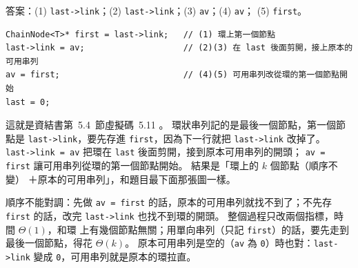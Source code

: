 \begin{pastsoln}
答案：(1) \texttt{last->link}；(2) \texttt{last->link}；(3) \texttt{av}；(4) \texttt{av}；
(5) \texttt{first}。

\begin{verbatim}
ChainNode<T>* first = last->link;   // (1) 環上第一個節點
last->link = av;                    // (2)(3) 在 last 後面剪開，接上原本的可用串列
av = first;                         // (4)(5) 可用串列改從環的第一個節點開始
last = 0;
\end{verbatim}

這就是資結書第~5.4~節虛擬碼~5.11 。 環狀串列記的是最後一個節點，第一個節點是
\texttt{last->link}，要先存進 \texttt{first}，因為下一行就把 \texttt{last->link} 改掉了。
\texttt{last->link = av} 把環在 \texttt{last} 後面剪開，接到原本可用串列的開頭；
\texttt{av = first} 讓可用串列從環的第一個節點開始。 結果是「環上的 $k$ 個節點（順序不變）
＋原本的可用串列」，和題目最下面那張圖一樣。

順序不能對調：先做 \texttt{av = first} 的話，原本的可用串列就找不到了；不先存 \texttt{first}
的話，改完 \texttt{last->link} 也找不到環的開頭。 整個過程只改兩個指標，時間 $\Theta(1)$，和環
上有幾個節點無關；用單向串列（只記 \texttt{first}）的話，要先走到最後一個節點，得花
$\Theta(k)$。 原本可用串列是空的（\texttt{av} 為 \texttt{0}）時也對：\texttt{last->link} 變成
\texttt{0}，可用串列就是原本的環拉直。
\end{pastsoln}
